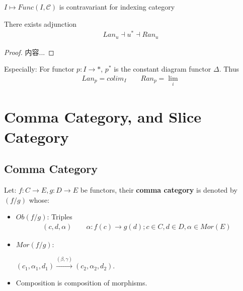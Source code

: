 \documentclass[Total.tex]{subfiles}
\begin{document}
			\begin{corollary}
				$I\mapsto Func(I,\mathcal{C})$ is contravariant for indexing category
			\end{corollary}
			
			
			\begin{proposition}
				There exists adjunction
				\begin{gather*}
					Lan_u\dashv u^*\dashv Ran_u
				\end{gather*}
			\end{proposition}
			\begin{proof}
				内容...
			\end{proof}
			
			
			Especially: For functor $p:I\rightarrow *$, $p^*$ is the constant diagram functor $\Delta$. Thus
			\begin{gather*}
				Lan_p=colim_I\qquad Ran_p=\lim_i
			\end{gather*}
			
		\section{Comma Category, and Slice Category}
			\subsection{Comma Category}
				\begin{Def}
					Let: $f:C\rightarrow E,g:D\rightarrow E$ be functors, their \textbf{comma category} is denoted by $(f/g)$ whose:
					\begin{itemize}
						\item $Ob(f/g)$: Triples
						\begin{gather*}
							(c,d,\alpha)\qquad \alpha:f(c)\rightarrow g(d);c\in C,d\in D,\alpha\in Mor(E)
						\end{gather*}
						\item $Mor(f/g)$:
						\begin{center}
							\qquad $(c_1,\alpha_1,d_1)\stackrel{(\beta,\gamma)}{\rightarrow} (c_2,\alpha_2,d_2)$. 
						\end{center}
						\item Composition is composition of morphisms.
					\end{itemize}
				\end{Def}
				
\end{document}
